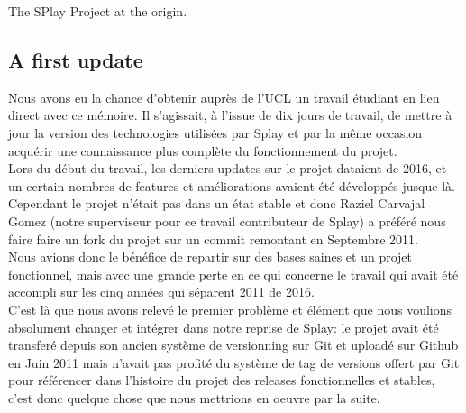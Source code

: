 \documentclass{eplmastersthesis}
\begin{document}
        The SPlay Project at the origin.

      \subsection{A first update}

        Nous avons eu la chance d'obtenir auprès de l'UCL un travail étudiant
        en lien direct avec ce mémoire. Il s'agissait, à l'issue de dix jours
        de travail, de mettre à jour la version des technologies utilisées par
        Splay et par la même occasion acquérir une connaissance plus complète
        du fonctionnement du projet.\\

        Lors du début du travail, les derniers updates sur le projet dataient
        de 2016, et un certain nombres de features et améliorations avaient
        été développés jusque là. Cependant le projet n'était pas dans un
        état stable et donc Raziel Carvajal Gomez (notre superviseur pour ce
        travail contributeur de Splay) a préféré nous faire faire un fork
        du projet sur un commit remontant en Septembre 2011.\\
        Nous avions donc le bénéfice de repartir sur des bases saines et
        un projet fonctionnel, mais avec une grande perte en ce qui concerne
        le travail qui avait été accompli sur les cinq années qui séparent
        2011 de 2016.\\
        C'est là que nous avons relevé le premier problème
        et élément que nous voulions absolument changer et intégrer dans notre
        reprise de Splay: le projet avait été transferé depuis son ancien
        système de versionning sur Git et uploadé sur Github en Juin 2011 mais
        n'avait pas profité du système de tag de versions offert par Git pour
        référencer dans l'histoire du projet des releases fonctionnelles
        et stables, c'est donc quelque chose que nous mettrions en oeuvre
        par la suite.\\
\end{document}
